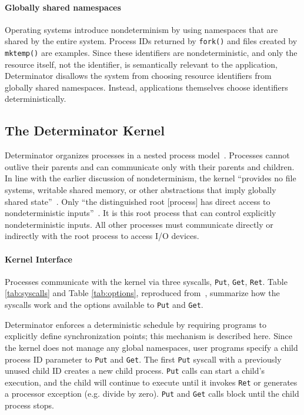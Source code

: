 \paragraph{Globally shared namespaces}
Operating systems introduce nondeterminism by using namespaces that are shared
by the entire system. Process IDs returned by {\tt fork()} and files created
by {\tt mktemp()} are examples. Since these identifiers are nondeterministic,
and only the resource itself, not the identifier, is semantically relevant to
the application, Determinator disallows the system from choosing resource
identifiers from globally shared namespaces. Instead, applications themselves
choose identifiers deterministically.

\subsection{The Determinator Kernel}

Determinator organizes processes in a nested process model~\cite{Ford96}.
Processes cannot outlive their parents and can communicate only with their
parents and children. In line with the earlier discussion of nondeterminism,
the kernel ``provides no file systems, writable shared memory, or other
abstractions that imply globally shared state''~\cite{Aviram10}. Only ``the
distinguished root [process] has direct access to nondeterministic
inputs''~\cite{Aviram10}. It is this root process that can control explicitly
nondeterministic inputs. All other processes must communicate
directly or indirectly with the root process to access I/O devices.




\paragraph{Kernel Interface} Processes communicate with the kernel via three
syscalls, {\tt Put}, {\tt Get}, {\tt Ret}. Table \ref{tab:syscalls} and Table
\ref{tab:options}, reproduced from~\cite{Aviram10}, summarize how the syscalls
work and the options available to {\tt Put} and {\tt Get}.

Determinator enforces a deterministic schedule by requiring programs to
explicitly define synchronization points; this mechanism is described here.
Since the kernel does not manage any global namespaces, user programs specify
a child process ID parameter to {\tt Put} and {\tt Get}. The first {\tt Put}
syscall with a previously unused child ID creates a new child process.
{\tt Put} calls can start a child's execution, and the child will continue to
execute until it invokes {\tt Ret} or generates a processor exception (e.g.
divide by zero). {\tt Put} and {\tt Get} calls block until the child process
stops.

